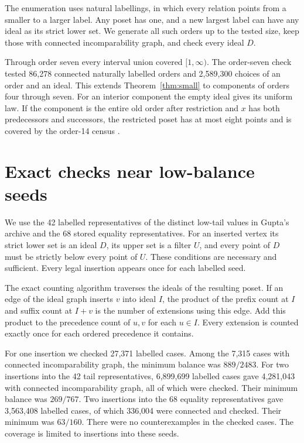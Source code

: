\documentclass[10pt]{article}
\begin{document}
The enumeration uses natural labellings, in which every relation points
from a smaller to a larger label. Any poset has one, and a new largest
label can have any ideal as its strict lower set. We generate all such
orders up to the tested size, keep those with connected incomparability
graph, and check every ideal \(D\).

Through order seven every interval union covered \([1,\infty)\). The
order-seven check tested 86,278 connected naturally labelled orders and
2,589,300 choices of an order and an ideal. This extends
Theorem~\ref{thm:small} to components of orders four through seven.
For an interior component the empty ideal gives its uniform law. If
the component is the entire old order after restriction and \(x\) has both
predecessors and successors, the restricted poset has at most eight
points and is covered by the order-14 census \cite{gupta}.

\section*{Exact checks near low-balance seeds}
We use the 42 labelled representatives of the distinct low-tail
values in Gupta's archive and the 68 stored equality representatives.
For an inserted vertex its strict lower set is an ideal \(D\), its
upper set is a filter \(U\), and every point of \(D\) must be strictly
below every point of \(U\). These conditions are necessary and
sufficient. Every legal insertion appears once for each labelled seed.

The exact counting algorithm traverses the ideals of the resulting
poset. If an edge of the ideal graph inserts \(v\) into ideal \(I\), the
product of the prefix count at \(I\) and suffix count at \(I+v\) is the
number of extensions using this edge. Add this product to the
precedence count of \(u,v\) for each \(u\in I\). Every extension is
counted exactly once for each ordered precedence it contains.

For one insertion we checked 27,371 labelled cases. Among the 7,315
cases with connected incomparability graph, the minimum balance was
\(889/2483\). For two insertions into the 42 tail representatives,
6,899,699 labelled cases gave 4,281,043 with connected incomparability
graph, all of which were checked. Their minimum balance was
\(269/767\). Two insertions into the 68 equality representatives gave
3,563,408 labelled cases, of which 336,004 were connected and checked.
Their minimum was \(63/160\). There were no counterexamples in the
checked cases. The coverage is limited to insertions into these seeds.
\end{document}
